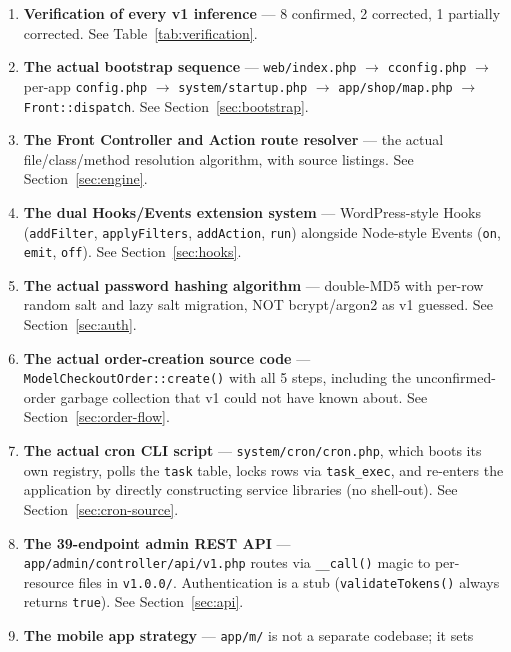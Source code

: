 \documentclass[11pt,a4paper]{article}
\begin{document}
\begin{enumerate}[leftmargin=1.6em,itemsep=2pt]
  \item \textbf{Verification of every v1 inference} --- 8 confirmed,
        2 corrected, 1 partially corrected. See
        Table~\ref{tab:verification}.
  \item \textbf{The actual bootstrap sequence} --- \texttt{web/index.php}
        $\to$ \texttt{cconfig.php} $\to$ per-app \texttt{config.php}
        $\to$ \texttt{system/startup.php} $\to$ \texttt{app/shop/map.php}
        $\to$ \texttt{Front::dispatch}. See
        Section~\ref{sec:bootstrap}.
  \item \textbf{The Front Controller and Action route resolver} ---
        the actual file/class/method resolution algorithm, with
        source listings. See Section~\ref{sec:engine}.
  \item \textbf{The dual Hooks/Events extension system} ---
        WordPress-style Hooks (\texttt{addFilter}, \texttt{applyFilters},
        \texttt{addAction}, \texttt{run}) alongside Node-style Events
        (\texttt{on}, \texttt{emit}, \texttt{off}). See
        Section~\ref{sec:hooks}.
  \item \textbf{The actual password hashing algorithm} --- double-MD5
        with per-row random salt and lazy salt migration, NOT
        bcrypt/argon2 as v1 guessed. See Section~\ref{sec:auth}.
  \item \textbf{The actual order-creation source code} ---
        \texttt{ModelCheckoutOrder::create()} with all 5 steps,
        including the unconfirmed-order garbage collection that v1
        could not have known about. See Section~\ref{sec:order-flow}.
  \item \textbf{The actual cron CLI script} ---
        \texttt{system/cron/cron.php}, which boots its own registry,
        polls the \texttt{task} table, locks rows via
        \texttt{task\_exec}, and re-enters the application by
        directly constructing service libraries (no shell-out). See
        Section~\ref{sec:cron-source}.
  \item \textbf{The 39-endpoint admin REST API} ---
        \texttt{app/admin/controller/api/v1.php} routes via
        \texttt{\_\_call()} magic to per-resource files in
        \texttt{v1.0.0/}. Authentication is a stub
        (\texttt{validateTokens()} always returns \texttt{true}).
        See Section~\ref{sec:api}.
  \item \textbf{The mobile app strategy} ---
        \texttt{app/m/} is not a separate codebase; it sets

\end{enumerate}
\end{document}
